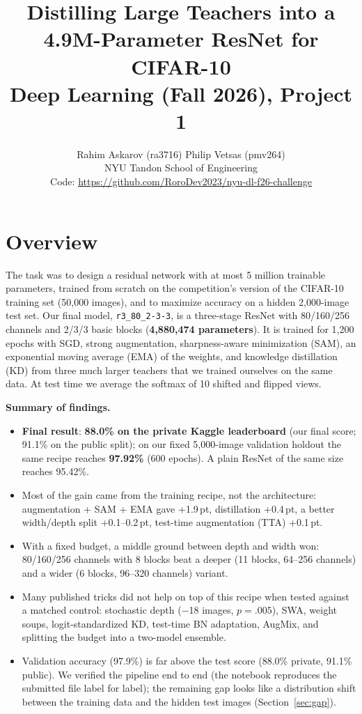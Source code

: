 \documentclass[10pt]{article}
\title{\vspace{-1.2em}\textbf{Distilling Large Teachers into a 4.9M-Parameter ResNet for CIFAR-10}\\[2pt]
\large Deep Learning (Fall 2026), Project 1}
\author{Rahim Askarov (ra3716) \qquad Philip Vetsas (pmv264)\\[2pt]
NYU Tandon School of Engineering\\[3pt]
\normalsize Code: \url{https://github.com/RoroDev2023/nyu-dl-f26-challenge}}
\date{}
\newcommand{\pt}{\,pt}
\begin{document}
\maketitle
\vspace{-2.2em}

\section*{Overview}
The task was to design a residual network \cite{he2016deep} with at most 5 million trainable parameters,
trained from scratch on the competition's version of the CIFAR-10 training set \cite{krizhevsky2009} (50,000 images),
and to maximize accuracy on a hidden 2,000-image test set. Our final model, \texttt{r3\_80\_2-3-3}, is a
three-stage ResNet with 80/160/256 channels and 2/3/3 basic blocks
(\textbf{4,880,474 parameters}). It is trained for 1,200 epochs with SGD, strong augmentation,
sharpness-aware minimization (SAM), an exponential moving average (EMA) of the weights, and
knowledge distillation (KD) from three much larger teachers that we trained ourselves on the same
data. At test time we average the softmax of 10 shifted and flipped views.

\textbf{Summary of findings.}
\begin{itemize}
\item \textbf{Final result}: \textbf{88.0\% on the private Kaggle leaderboard} (our final score; 91.1\% on the public split); on our fixed 5,000-image
  validation holdout the same recipe reaches \textbf{97.92\%} (600 epochs). A plain ResNet of the same
  size reaches 95.42\%.
\item Most of the gain came from the training recipe, not the architecture: augmentation + SAM + EMA
  gave +1.9\pt, distillation +0.4\pt, a better width/depth split +0.1--0.2\pt, test-time augmentation
  (TTA) +0.1\pt.
\item With a fixed budget, a middle ground between depth and width won: 80/160/256 channels with
  8 blocks beat a deeper (11 blocks, 64--256 channels) and a wider (6 blocks, 96--320 channels) variant.
\item Many published tricks did not help on top of this recipe when tested against a matched control:
  stochastic depth ($-$18 images, $p{=}.005$), SWA, weight soups, logit-standardized KD,
  test-time BN adaptation, AugMix, and splitting the budget into a two-model ensemble.
\item Validation accuracy (97.9\%) is far above the test score (88.0\% private, 91.1\% public). We verified the pipeline end to end
  (the notebook reproduces the submitted file label for label); the remaining gap looks like a
  distribution shift between the training data and the hidden test images (Section~\ref{sec:gap}).
\end{itemize}
\end{document}
